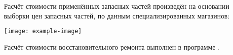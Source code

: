 %

\par
Расчёт стоимости применённых запасных частей произведён на основании выборки цен запасных частей, по данным специализированных магазинов:

\begin{center}
	\texttt{[image: example-image]}
\end{center}


 Расчёт стоимости восстановительного ремонта выполнен в программе \silver.\\

